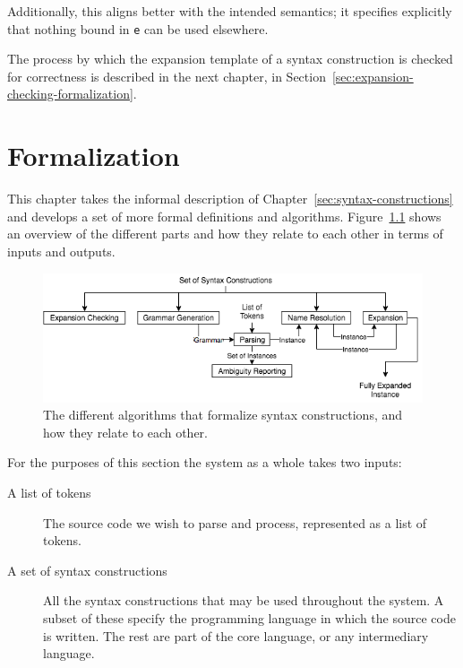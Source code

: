 \documentclass{kththesis}
\begin{document}
Additionally, this aligns better with the intended semantics; it specifies explicitly that nothing bound in \texttt{e} can be used elsewhere.

The process by which the expansion template of a syntax construction is checked for correctness is described in the next chapter, in Section~\ref{sec:expansion-checking-formalization}.

\chapter{Formalization} \label{sec:formalization}

This chapter takes the informal description of Chapter~\ref{sec:syntax-constructions} and develops a set of more formal definitions and algorithms. Figure~\ref{fig:formalization-flowchart} shows an overview of the different parts and how they relate to each other in terms of inputs and outputs.

\begin{figure}[t]
\includegraphics[width=\textwidth]{resources/formalization-flowchart}
\caption{The different algorithms that formalize syntax constructions, and how they relate to each other.}
\label{fig:formalization-flowchart}
\end{figure}

For the purposes of this section the system as a whole takes two inputs:

\begin{description}
  \item[A list of tokens] The source code we wish to parse and process, represented as a list of tokens.
  \item[A set of syntax constructions] All the syntax constructions that may be used throughout the system. A subset of these specify the programming language in which the source code is written. The rest are part of the core language, or any intermediary language.
\end{description}
\end{document}
